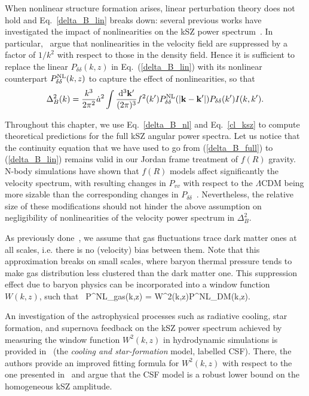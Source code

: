 When nonlinear structure formation arises, linear perturbation theory does not hold and Eq.~\eqref{delta_B_lin} breaks down: several previous works have investigated the impact of nonlinearities on the kSZ power spectrum~\citep{Hu2000a,Ma2002,Shaw2012}. In particular,~\cite{Hu2000a,Ma2002} argue that nonlinearities in the velocity field are suppressed by a factor of $1/k^2$ with respect to those in the density field. Hence it is sufficient to  replace the linear $P_{\delta\delta}(k,z)$ in Eq.~(\eqref{delta_B_lin}) with its nonlinear counterpart $P^{\rm{NL}}_{\delta\delta}(k,z)$ to capture the effect of nonlinearities, so that
\begin{equation}
\label{delta_B_nl} 
\Delta^2_B(k)= \frac{k^3}{2\pi^2}\dot{a}^2 \int \frac{\diff^3\mathbf{k}'}{(2\pi)^3}f^2(k') P^{\rm{NL}}_{\delta\delta}(|\mathbf{k}-\mathbf{k'}|) P_{\delta\delta}(k')I(k,k').
\end{equation}

Throughout this chapter, we use Eq.~\eqref{delta_B_nl} and Eq.~\eqref{cl_ksz} to compute theoretical predictions for the full kSZ angular power spectra. Let us notice that the continuity equation that we have used to go from (\eqref{delta_B_full}) to (\eqref{delta_B_lin}) remains valid in our Jordan frame treatment of $f(R)$ gravity. N-body simulations have shown that $f(R)$ models affect significantly the velocity spectrum, with resulting changes in $P_{vv}$ with respect to the $\Lambda$CDM being more sizable than the corresponding changes in $P_{\delta\delta}$~\citep{Li2013}. Nevertheless, the relative size of these modifications should not hinder the above assumption on negligibility of nonlinearities of the velocity power spectrum in $\Delta_B^2$.  

As previously done~\citep{Jaffe1998,Dodelson1995,Ma2002,Zhang2004}, we assume that gas fluctuations trace dark matter ones at all scales, i.e. there is no (velocity) bias between them. Note that this approximation breaks on small scales, where baryon thermal pressure tends to make gas distribution less clustered than the dark matter one. This suppression effect due to baryon physics can be incorporated into a window function $W(k,z)$, such that~\citep{Shaw2012}
\be
\label{gas_window}
P^{\rm{NL}}_{\rm gas}(k,z) =  W^2(k,z)P^{\rm{NL}}_{\rm DM}(k,z).
\ee

An investigation of the astrophysical processes such as radiative cooling, star formation, and supernova feedback on the kSZ power spectrum achieved by measuring the window function $W^2(k,z)$ in hydrodynamic simulations is provided in~\cite{Shaw2012} (the \textit{cooling and star-formation} model, labelled CSF). There, the authors provide an improved fitting formula for $W^2(k,z)$ with respect to the one presented in~\cite{Gnedin1998} and argue that the CSF model is a robust lower bound on the homogeneous kSZ amplitude.


